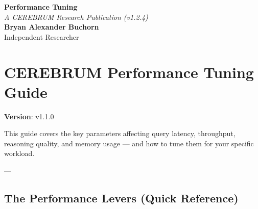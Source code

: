 \documentclass[11pt,article,oneside]{memoir}
\begin{document}
\begin{center}
    \Huge \textbf{Performance Tuning} \\
    \vspace{0.5em}
    \large \textit{A CEREBRUM Research Publication (v1.2.4)} \\
    \vspace{1em}
    \large \textbf{Bryan Alexander Buchorn} \\
    Independent Researcher \\
    \vspace{2em}
\end{center}

\begin{abstract}
\textbf{Overview:} This guide provides a conceptual entry point into the CEREBRUM framework. It is designed for practitioners and researchers seeking to understand the core reasoning signals of Framework Implementation Guide.
\end{abstract}

\section{CEREBRUM Performance Tuning Guide}

\textbf{Version}: v1.1.0

This guide covers the key parameters affecting query latency, throughput, reasoning quality, and memory usage — and how to tune them for your specific workload.

---

\subsection{The Performance Levers (Quick Reference)}
\end{document}
